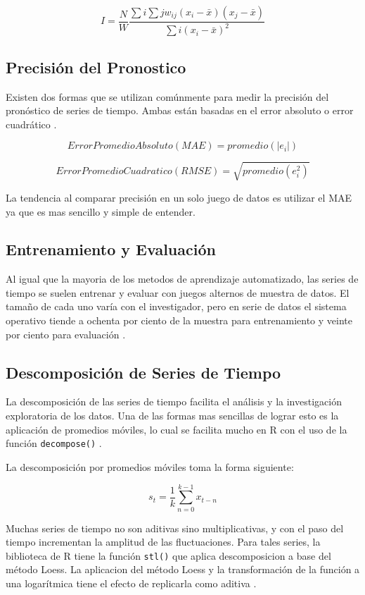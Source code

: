 \documentclass[letterpaper, spanish, 11pt]{report}
\begin{document}
\[ I = \frac{N}{W} 
	\frac{\sum{i}\sum{j}w_{ij}(x_{i} - \bar{x})(x_{j} - \bar{x})}{{\sum{i}(x_{i} - \bar{x})^2}} \]

\subsection{Precisión del Pronostico}
Existen dos formas que se utilizan comúnmente para medir la precisión del pronóstico de series de tiempo. Ambas están basadas en el error absoluto o error cuadrático \cite{hyndman}.

\[Error Promedio Absoluto (MAE) = promedio(|e_{i}|)\]

\[ Error Promedio Cuadratico (RMSE) = \sqrt{promedio(e_{i}^2)}  \]

La tendencia al comparar precisión en un solo juego de datos es utilizar el MAE ya que es mas sencillo y simple de entender. 

\subsection{Entrenamiento y Evaluación}
Al igual que la mayoria de los metodos de aprendizaje automatizado, las series de tiempo se suelen entrenar y evaluar con juegos alternos de muestra de datos. El tamaño de cada uno varía con el investigador, pero en serie de datos el sistema operativo tiende a ochenta por ciento de la muestra para entrenamiento y veinte por ciento para evaluación \cite{hyndman}.

\subsection{Descomposición de Series de Tiempo}
La descomposición de las series de tiempo facilita el análisis y la investigación exploratoria de los datos. Una de las formas mas sencillas de lograr esto es la aplicación de promedios móviles, lo cual se facilita mucho en R con el uso de la función \texttt{decompose()} \cite{daroczi}.

La descomposición por promedios móviles toma la forma siguiente:

\[ s_{t} = \frac{1}{k} \sum_{n = 0}^{k - 1} x_{t - n}  \]

Muchas series de tiempo no son aditivas sino multiplicativas, y con el paso del tiempo incrementan la amplitud de las fluctuaciones. Para tales series, la biblioteca de R tiene la función \texttt{stl()} que aplica descomposicion a base del método Loess. La aplicacion del método Loess y la transformación de la función a una logarítmica tiene el efecto de replicarla como aditiva \cite{viswanathan}.
\end{document}
